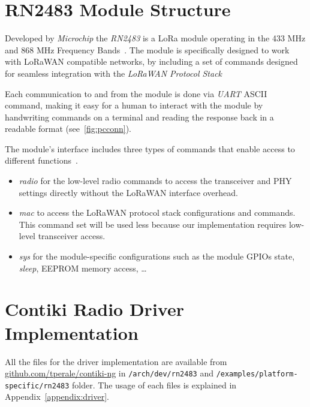 \section{RN2483 Module Structure}

Developed by \emph{Microchip} the \emph{RN2483} is a LoRa module operating in
the 433 MHz and 868 MHz Frequency Bands~\cite{microchip:rn2483}.
The module is specifically designed to work with LoRaWAN compatible networks,
by including a set of commands designed for seamless integration with the
\emph{LoRaWAN Protocol Stack}

Each communication to and from the module is done via \emph{UART} ASCII command,
making it easy for a human to interact with the module by handwriting commands
on a terminal and reading the response back in a readable format
(see~\ref{fig:pcconn}).



The module's interface includes three types of commands that enable access to
different functions~\cite{microchip:reference}.

\begin{itemize}
  \item \emph{radio} for the low-level radio commands to access the transceiver
    and PHY settings directly without the LoRaWAN interface overhead.
  \item \emph{mac} to access the LoRaWAN protocol stack configurations and
    commands. This command set will be used less because our implementation
    requires low-level transceiver access.
  \item \emph{sys} for the module-specific configurations such as the module
    GPIOs state, \emph{sleep}, EEPROM memory access, \ldots
\end{itemize}

\section{Contiki Radio Driver Implementation}

All the files for the driver implementation are available from
\href{https://github.com/tperale/contiki-ng}{github.com/tperale/contiki-ng}
in \lstinline{/arch/dev/rn2483} and
\lstinline{/examples/platform-specific/rn2483} folder.
The usage of each files is explained in Appendix~\ref{appendix:driver}.

\paragraph{}

